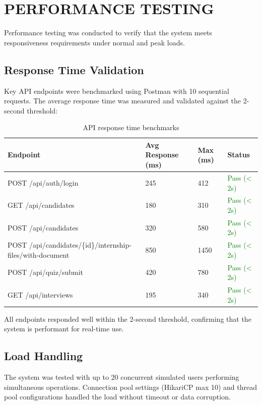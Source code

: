 \section{PERFORMANCE TESTING}
Performance testing was conducted to verify that the system meets responsiveness requirements under normal and peak loads.

\subsection{Response Time Validation}
Key API endpoints were benchmarked using Postman with 10 sequential requests. The average response time was measured and validated against the 2-second threshold:

\begin{table}[H]
\centering
\begin{tabular}{|p{4cm}|p{3cm}|p{3cm}|p{3cm}|}
\hline
\rowcolor{gray!20}
\textbf{Endpoint} & \textbf{Avg Response (ms)} & \textbf{Max (ms)} & \textbf{Status} \\
\hline
POST /api/auth/login & 245 & 412 & \textcolor{green}{Pass (< 2s)} \\
\hline
GET /api/candidates & 180 & 310 & \textcolor{green}{Pass (< 2s)} \\
\hline
POST /api/candidates & 320 & 580 & \textcolor{green}{Pass (< 2s)} \\
\hline
POST /api/candidates/{\{id\}}/internship-files/with-document & 850 & 1450 & \textcolor{green}{Pass (< 2s)} \\
\hline
POST /api/quiz/submit & 420 & 780 & \textcolor{green}{Pass (< 2s)} \\
\hline
GET /api/interviews & 195 & 340 & \textcolor{green}{Pass (< 2s)} \\
\hline
\end{tabular}
\caption{API response time benchmarks}
\end{table}

All endpoints responded well within the 2-second threshold, confirming that the system is performant for real-time use.

\subsection{Load Handling}
The system was tested with up to 20 concurrent simulated users performing simultaneous operations. Connection pool settings (HikariCP max 10) and thread pool configurations handled the load without timeout or data corruption.

